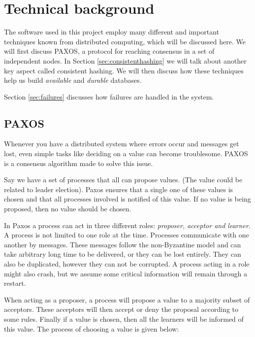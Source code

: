 
\section{Technical background}
\label{sec:technical_background}

The software used in this project employ many different and important techniques known from distributed computing, which will be discussed here.
We will first discuss PAXOS, a protocol for reaching consensus in a set of independent nodes.
In Section \ref{sec:consistenthashing} we will talk about another key aspect called consistent hashing.
We will then discuss how these techniques help us build \emph{available} and \emph{durable} databases.

Section \ref{sec:failures} discusses how failures are handled in the system.

\subsection{PAXOS}
Whenever you have a distributed system where errors occur and messages get lost, even simple tasks like deciding on a value can become troublesome. PAXOS is a consensus algorithm made to solve this issue. 

Say we have a set of processes that all can propose values. (The value could be related to leader election). Paxos ensures that a single one of these values is chosen and that all processes involved is notified of this value. If no value is being proposed, then no value should be chosen. 

In Paxos a process can act in three different roles: {\it proposer, acceptor and learner}. A process is not limited to one role at the time. Processes communicate with one another by messages. These messages follow the non-Byzantine model and can take arbitrary long time to be delivered, or they can be lost entirely. They can also be duplicated, however they can not be corrupted. A process acting in a role might also crash, but we assume some critical information will remain through a restart. 

When acting as a proposer, a process will propose a value to a majority subset of acceptors. These acceptors will then accept or deny the proposal according to some rules. Finally if a value is chosen, then all the learners will be informed of this value. The process of choosing a value is given below:

